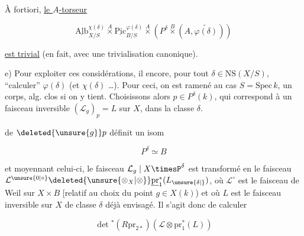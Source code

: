 
À fortiori, \uline{le $A$-torseur}

\[
\underline{\mathrm{Alb}}^{\chi(\delta)}_{X/S}\overset A\times\underline{\mathrm{Pic}}^{\varphi(\delta)}_{B/S}\overset A\times(P^\delta\overset B\times(A,\widetilde{\varphi(\delta)}))
\]

\uline{est trivial} (en fait, avec une trivialisation canonique).

e) Pour exploiter ces considérations, il  encore, pour tout $\delta\in\mathrm{NS}(X/S)$, ``calculer'' $\varphi(\delta)$ (et $\chi(\delta)$ \ldots). Pour ceci, on  est ramené au cas $S=\mathrm{Spec}\,k$,  un corps, alg. clos si on y tient\deleted{\unsure{)}}. Choisissons alors $p\in P^\delta(k)$, qui correspond à un faisceau inversible $(\mathcal L_g)_p=L$ sur $X$, dans la classe $\delta$.


 de $\deleted{\unsure{g}}p$ définit un isom

\[
P^\delta\simeq B
\]

et moyennant celui-ci, le faisceau $\mathcal L_g\mid X\timesP^\delta$  est transformé en  le faisceau $\mathcal L^{\unsure{0|\circ}}\deleted{\unsure{\otimes_X|\otimes}}\underline{\mathrm{pr}}_1^*(L_{\unsure{\delta|{}}})$, où $\mathcal L^\circ$ est le faisceau de Weil sur $X\times B$ [relatif au choix du point $g\in X(k)$) et où $L$ est le faisceau inversible sur $X$  de classe $\delta$ déjà envisagé. Il s'agit donc de calculer

\[
\det{}^{*}(R\mathrm{pr}_{2*})(\mathcal L\otimes\mathrm{pr}_1^*(L))
\]
